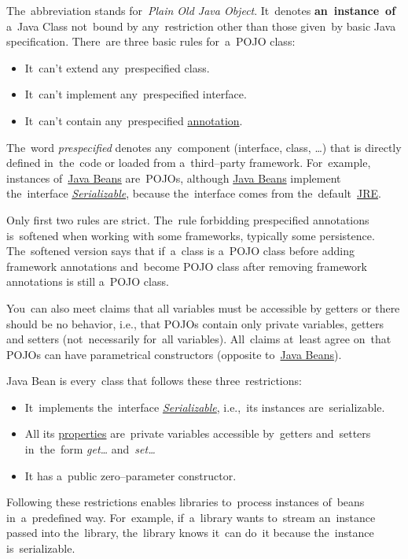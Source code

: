 \label{pojo}
The~abbreviation stands for~\textit{Plain Old Java Object}. It~denotes \textbf{an~instance~of} a~Java Class not~bound by any~restriction other than those given~by basic Java specification. There~are three basic rules for~a~POJO class:
\begin{itemize}
    \item It~can't extend any~prespecified class.
    \item It~can't implement any~prespecified interface.
    \item It~can't contain any~prespecified \hyperref[javaannotation]{annotation}.
\end{itemize}
\noindent The~word \textit{prespecified} denotes any~component (interface, class, \dots) that is directly defined in~the~code or loaded from a~third--party framework. For~example, instances of~\hyperref[javabeans]{Java Beans} are~POJOs, although \hyperref[javabeans]{Java Beans} implement the~interface \hyperref[serialization]{\textit{Serializable}}, because the~interface comes from the~default~\hyperref[jdkjrejvm]{JRE}.

\newline\warning Only first two rules are strict. The~rule forbidding prespecified annotations is~softened when working with some frameworks, typically some persistence. The~softened version says that if~a~class is a~POJO class before adding framework annotations and~become POJO class after removing framework annotations is still a~POJO class.

\newline\warning You~can also meet claims that all variables must be accessible by getters or there should be no behavior, i.e., that POJOs contain only private variables, getters and setters (not~necessarily for~all variables). All~claims at~least agree on~that POJOs can have parametrical constructors (opposite to~\hyperref[javabeans]{Java Beans}).

\label{javabeans}
Java Bean is every~class that follows these three~restrictions:
\begin{itemize}
    \item It~implements the~interface \hyperref[serialization]{\textit{Serializable}}, i.e.,~its instances are~serializable.
    \item All its \hyperref[variablefieldproperty]{properties} are~private variables accessible by~getters and~setters in~the~form \textit{get\dots} and~\textit{set\dots}
    \item It has a~public zero--parameter constructor.
\end{itemize}
\noindent Following these restrictions enables libraries to~process instances of~beans in~a~predefined way. For~example, if~a~library wants to~stream an~instance passed into the~library, the~library knows it~can do~it because the~instance is~serializable.

